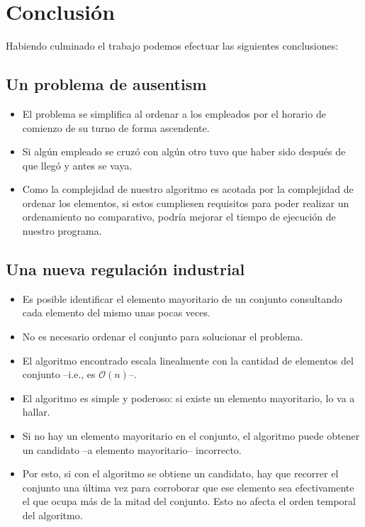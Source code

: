 \section{Conclusión}
Habiendo culminado el trabajo podemos efectuar las siguientes conclusiones:
 \subsection{Un problema de ausentism}    
\begin{itemize}
    \item El problema se simplifica al ordenar a los empleados por el horario de comienzo de su turno de forma ascendente.
    \item Si algún empleado se cruzó con algún otro tuvo que haber sido después de que llegó y antes se vaya.
    \item Como la complejidad de nuestro algoritmo es acotada por la complejidad de ordenar los elementos, si estos cumpliesen requisitos para poder realizar un ordenamiento no comparativo, podría mejorar el tiempo de ejecución de nuestro programa. 
    
\end{itemize}
 \subsection{Una nueva regulación industrial}    
\begin{itemize}
    \item Es posible identificar el elemento mayoritario de un conjunto consultando cada elemento del mismo unas pocas veces.
    \item No es necesario ordenar el conjunto para solucionar el problema.
    \item El algoritmo encontrado escala linealmente con la cantidad de elementos del conjunto --i.e., es $\mathcal{O}(n)$--.
    \item El algoritmo es simple y poderoso: si existe un elemento mayoritario, lo va a hallar. 
    \item Si no hay un elemento mayoritario en el conjunto, el algoritmo puede obtener un candidato --a elemento mayoritario-- incorrecto. 
    \item Por esto, si con el algoritmo se obtiene un candidato, hay que recorrer el conjunto una última vez para corroborar que ese elemento sea efectivamente el que ocupa más de la mitad del conjunto. Esto no afecta el orden temporal del algoritmo.
\end{itemize}
